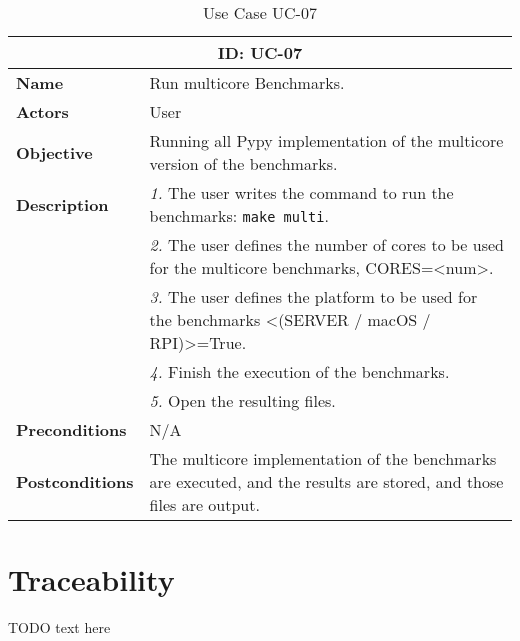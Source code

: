 \begin{table}[H]
    \centering
    \begin{tabular}{l p{10cm}}
        \toprule
        \multicolumn{2}{c}{\textbf{ID: UC-07}} \\
        \toprule
        \textbf{Name}                         &  Run multicore Benchmarks. \\
        \textbf{Actors}                       &  User \\
        \textbf{Objective}                    &  Running all Pypy implementation of the multicore version of the benchmarks. \\
        \multirow{1}{*}{\textbf{Description}} & \textsl{1.} The user writes the command to run the benchmarks: \texttt{make multi}.\\
                                              & \textsl{2.} The user defines the number of cores to be used for the multicore benchmarks, CORES=<num>.\\
                                              & \textsl{3.} The user defines the platform to be used for the benchmarks <(SERVER / macOS / RPI)>=True.\\
                                              & \textsl{4.} Finish the execution of the benchmarks.\\
                                              & \textsl{5.} Open the resulting files.\\ 
        \textbf{Preconditions}                &  N/A \\
        \textbf{Postconditions}               &  The multicore implementation of the benchmarks are executed, and the results are stored, and those files are output. \\
    \end{tabular}
    \caption{Use Case UC-07}
    \label{tab:uc-07}
\end{table}



\section{Traceability}

TODO text here 

